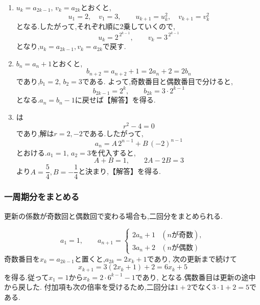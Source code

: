   \noindent{}\par\nobreak
  \begin{enumerate}[label=(\arabic*),parsep=3pt,format=\bookitemlink{example-nonadjacent-1}{solution}{problem}]
    \item $u_k=a_{2k-1},\,v_k=a_{2k}$とおくと,
          \[
            u_1=2,\quad v_1=3,\qquad
            u_{k+1}=u_k^2,\quad v_{k+1}=v_k^2
          \]
          となる.したがって,それぞれ順に2乗していくので,
          \[
            u_k=2^{\,2^{k-1}},\qquad v_k=3^{\,2^{k-1}}
          \]
          となり,$u_k=a_{2k-1},v_k=a_{2k}$で戻す.
    \item $b_n=a_n+1$とおくと,
          \[
            b_{n+2}=a_{n+2}+1=2a_n+2=2b_n
          \]
          であり,$b_1=2,\,b_2=3$である.
          よって,奇数番目と偶数番目で分けると,
          \[
            b_{2k-1}=2^k,\qquad b_{2k}=3\cdot2^{k-1}
          \]
          となる.$a_n=b_n-1$に戻せば【解答】を得る.
    \item {}は
          \[
            r^2-4=0
          \]
          であり,解は$r=2,-2$である.したがって,
          \[
            a_n=A\,2^{n-1}+B\,(-2)^{n-1}
          \]
          とおける.$a_1=1,\,a_2=3$を代入すると,
          \[
            A+B=1,\qquad 2A-2B=3
          \]
          より$A=\dfrac{5}{4},B=-\dfrac{1}{4}$と決まり,【解答】を得る.
  \end{enumerate}

  \subsubsection{一周期分をまとめる}\label{節：周期的な係数}
  更新の係数が奇数回と偶数回で変わる場合も,二回分をまとめられる.

  \[
    a_1=1,\qquad
    a_{n+1}=\begin{cases}
      2a_n+1&(n\text{が奇数}),\\
      3a_n+2&(n\text{が偶数})
    \end{cases}
  \]
  奇数番目を$x_k=a_{2k-1}$と置くと,$a_{2k}=2x_k+1$であり,
  次の更新まで続けて
  \[
    x_{k+1}=3(2x_k+1)+2=6x_k+5
  \]
  を得る.従って$x_1=1$から$x_k=2\cdot6^{k-1}-1$であり,
  \BookMathLayout{\[
    a_{2k-1}=2\cdot6^{k-1}-1,\qquad
    a_{2k}=4\cdot6^{k-1}-1\quad(k\ge1)
  \]}{\[
    \begin{aligned}
      a_{2k-1}&=2\cdot6^{k-1}-1,\\
      a_{2k}&=4\cdot6^{k-1}-1\quad(k\ge1)
    \end{aligned}
  \]}
  となる.偶数番目は更新の途中から戻した.
  付加項も次の倍率を受けるため,二回分は$1+2$でなく$3\cdot1+2=5$である.

